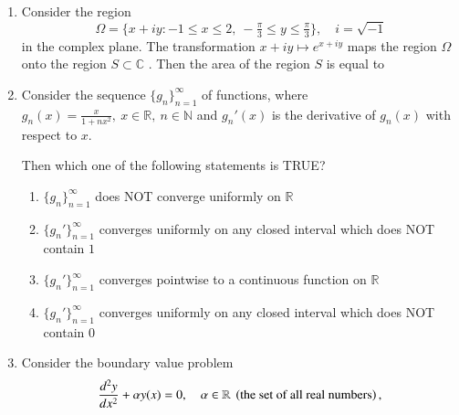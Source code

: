 \documentclass[journal,12pt,onecolumn]{IEEEtran}
\theoremstyle{remark}
\begin{document}
\begin{enumerate}[start=1, label=Q.\arabic*]
\hfill{}
\item Consider the region
\[
\Omega = \{x+iy : -1 \leq x \leq 2, \ -\tfrac{\pi}{3} \leq y \leq \tfrac{\pi}{3} \}, \quad i = \sqrt{-1}
\]
in the complex plane. The transformation $x+iy \mapsto e^{x+iy}$ maps the region $\Omega$ onto the region $S \subset \mathbb{C}$ . Then the area of the region $S$ is equal to
\begin{enumerate}
\end{enumerate}

\hfill{}


\item Consider the sequence $\{g_n\}_{n=1}^{\infty}$ of functions, where $g_n(x)=\tfrac{x}{1+nx^{2}}, \ x \in \mathbb{R}, \ n \in \mathbb{N}$ and $g_n'(x)$ is the derivative of $g_n(x)$ with respect to $x$.  



Then which one of the following statements is TRUE?
\begin{enumerate}
\item $\{g_n\}_{n=1}^{\infty}$ does NOT converge uniformly on $\mathbb{R}$
\item $\{g_n'\}_{n=1}^{\infty}$ converges uniformly on any closed interval which does NOT contain $1$
\item $\{g_n'\}_{n=1}^{\infty}$ converges pointwise to a continuous function on $\mathbb{R}$
\item $\{g_n'\}_{n=1}^{\infty}$ converges uniformly on any closed interval which does NOT contain $0$
\end{enumerate}

\hfill{}
\item Consider the boundary value problem 
\[
\frac{d^{2}y}{dx^{2}} + \alpha y(x)=0,\quad \alpha \in \mathbb{R} \ \left(\text{the set of all real numbers}\right),
\]
 


\end{enumerate}
\end{document}
